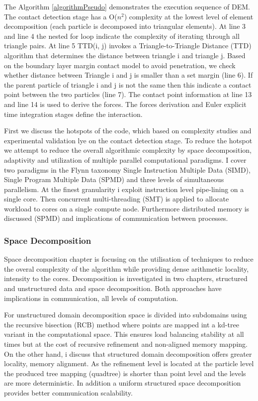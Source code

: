 \documentclass[times,12pt]{article}
\begin{document}
The Algorithm \ref{algorithmPseudo} demonstrates the execution sequence of DEM. The contact detection stage has a O($n^2$) complexity at the lowest level of element decomposition (each particle is decomposed into triangular elements). At line 3 and line 4 the nested for loop indicate the complexity of iterating through all triangle pairs. At line 5 TTD(i, j) invokes a Triangle-to-Triangle Distance (TTD) algorithm that determines the distance between triangle i and triangle j. Based on the boundary layer margin contact model \cite{Krestenitis2015} to avoid penetration, we check whether distance between Triangle i and j is smaller than a set margin (line 6). If the parent particle of triangle i and j is not the same then this indicate a contact point between the two particles (line 7). The contact point information at line 13 and line 14 is used to derive the forces. The forces derivation and Euler explicit time integration stages define the interaction. 

First we discuss the hotspots of the code, which based on complexity studies and experimental validation lye on the contact detection stage. To reduce the hotspot we attempt to reduce the overall algorithmic complexity by space decomposition, adaptivity and utilization of multiple parallel computational paradigms. I cover two paradigms in the Flynn taxonomy Single Instruction Multiple Data (SIMD), Single Program Multiple Data (SPMD) and three levels of simultaneous parallelism. At the finest granularity i exploit instruction level pipe-lining on a single core. Then concurrent multi-threading (SMT) is applied to allocate workload to cores on a single compute node. Furthermore distributed memory is discussed (SPMD) and implications of communication between processes.

\subsubsection{Space Decomposition}

Space decomposition chapter is focusing on the utilisation of techniques to reduce the overal complexity of the algorithm while providing dense arithmetic locality, intensity to the cores. Decomposition is investigated in two chapters, structured and unstructured data and space decomposition. Both approaches have implications in communication, all levels of computation. 

For unstructured domain decomposition space is divided into subdomains using the recursive bisection (RCB) method where points are mapped int a kd-tree variant in the computational space. This ensures load balancing stability at all times but at the cost of recursive refinement and non-aligned memory mapping. On the other hand, i discuss that structured domain decomposition offers greater locality, memory alignment. As the refinement level is located at the particle level the produced tree mapping (quadtree) is shorter than point level and the levels are more deterministic. In addition a uniform structured space decomposition provides better communication scalability.  
\end{document}
